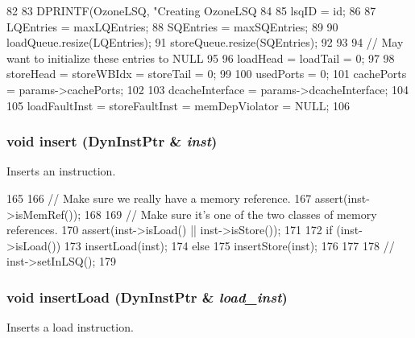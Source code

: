 \begin{DoxyCode}
82 {
83     DPRINTF(OzoneLSQ, "Creating OzoneLSQ%
84 
85     lsqID = id;
86 
87     LQEntries = maxLQEntries;
88     SQEntries = maxSQEntries;
89 
90     loadQueue.resize(LQEntries);
91     storeQueue.resize(SQEntries);
92 
93 
94     // May want to initialize these entries to NULL
95 
96     loadHead = loadTail = 0;
97 
98     storeHead = storeWBIdx = storeTail = 0;
99 
100     usedPorts = 0;
101     cachePorts = params->cachePorts;
102 
103     dcacheInterface = params->dcacheInterface;
104 
105     loadFaultInst = storeFaultInst = memDepViolator = NULL;
106 }
\end{DoxyCode}
\hypertarget{classOzoneLSQ_a773e88db1aa010c3755e603493bf40ec}{
\subsubsection[{insert}]{\setlength{\rightskip}{0pt plus 5cm}void insert ({\bf DynInstPtr} \& {\em inst})}}
\label{classOzoneLSQ_a773e88db1aa010c3755e603493bf40ec}
Inserts an instruction. 


\begin{DoxyCode}
165 {
166     // Make sure we really have a memory reference.
167     assert(inst->isMemRef());
168 
169     // Make sure it's one of the two classes of memory references.
170     assert(inst->isLoad() || inst->isStore());
171 
172     if (inst->isLoad()) {
173         insertLoad(inst);
174     } else {
175         insertStore(inst);
176     }
177 
178 //    inst->setInLSQ();
179 }
\end{DoxyCode}
\hypertarget{classOzoneLSQ_ad22b3ecafed2bcd9c59fcab049a1cb98}{
\subsubsection[{insertLoad}]{\setlength{\rightskip}{0pt plus 5cm}void insertLoad ({\bf DynInstPtr} \& {\em load\_\-inst})}}
\label{classOzoneLSQ_ad22b3ecafed2bcd9c59fcab049a1cb98}
Inserts a load instruction. 



